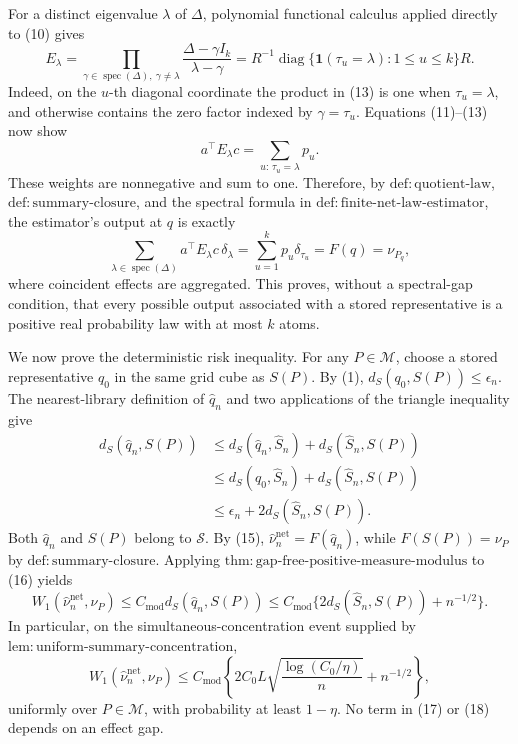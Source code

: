 For a distinct eigenvalue \(\lambda\) of \(\Delta\), polynomial functional calculus applied directly to (10) gives
\[
E_\lambda
=\prod_{\gamma\in\operatorname{spec}(\Delta),\ \gamma\ne\lambda}
 \frac{\Delta-\gamma I_k}{\lambda-\gamma}
=R^{-1}\operatorname{diag}\{\mathbf 1(\tau_u=\lambda):1\le u\le k\}R. \tag{13}
\]
Indeed, on the \(u\)-th diagonal coordinate the product in (13) is one when \(\tau_u=\lambda\), and otherwise contains the zero factor indexed by \(\gamma=\tau_u\).  Equations (11)--(13) now show
\[
a^\top E_\lambda c
=\sum_{u:\,\tau_u=\lambda}p_u. \tag{14}
\]
These weights are nonnegative and sum to one.  Therefore, by \(\mathrm{def:quotient\text{-}law}\), \(\mathrm{def:summary\text{-}closure}\), and the spectral formula in \(\mathrm{def:finite\text{-}net\text{-}law\text{-}estimator}\), the estimator's output at \(q\) is exactly
\[
\sum_{\lambda\in\operatorname{spec}(\Delta)}a^\top E_\lambda c\,\delta_\lambda
=\sum_{u=1}^kp_u\delta_{\tau_u}
=F(q)=\nu_{P_q}, \tag{15}
\]
where coincident effects are aggregated.  This proves, without a spectral-gap condition, that every possible output associated with a stored representative is a positive real probability law with at most \(k\) atoms.

We now prove the deterministic risk inequality.  For any \(P\in\mathcal M\), choose a stored representative \(q_0\) in the same grid cube as \(S(P)\).  By (1), \(d_S(q_0,S(P))\le\epsilon_n\).  The nearest-library definition of \(\widehat q_n\) and two applications of the triangle inequality give
\[
\begin{aligned}
d_S(\widehat q_n,S(P))
&\le d_S(\widehat q_n,\widehat S_n)+d_S(\widehat S_n,S(P))\\
&\le d_S(q_0,\widehat S_n)+d_S(\widehat S_n,S(P))\\
&\le \epsilon_n+2d_S(\widehat S_n,S(P)).
\end{aligned} \tag{16}
\]
Both \(\widehat q_n\) and \(S(P)\) belong to \(\mathscr S\).  By (15), \(\widehat\nu_n^{\mathrm{net}}=F(\widehat q_n)\), while \(F(S(P))=\nu_P\) by \(\mathrm{def:summary\text{-}closure}\).  Applying \(\mathrm{thm:gap\text{-}free\text{-}positive\text{-}measure\text{-}modulus}\) to (16) yields
\[
W_1(\widehat\nu_n^{\mathrm{net}},\nu_P)
\le C_{\mathrm{mod}}d_S(\widehat q_n,S(P))
\le C_{\mathrm{mod}}\{2d_S(\widehat S_n,S(P))+n^{-1/2}\}. \tag{17}
\]
In particular, on the simultaneous-concentration event supplied by \(\mathrm{lem:uniform\text{-}summary\text{-}concentration}\),
\[
W_1(\widehat\nu_n^{\mathrm{net}},\nu_P)
\le C_{\mathrm{mod}}\left\{2C_0L\sqrt{\frac{\log(C_0/\eta)}{n}}+n^{-1/2}\right\}, \tag{18}
\]
uniformly over \(P\in\mathcal M\), with probability at least \(1-\eta\).  No term in (17) or (18) depends on an effect gap.

